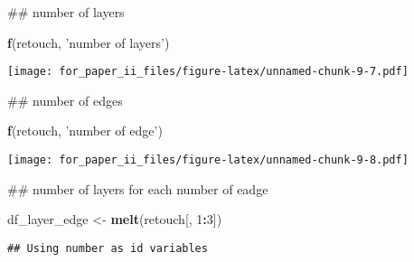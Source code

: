 \documentclass[]{article}
\newenvironment{Shaded}{\begin{snugshade}}{\end{snugshade}}
\newcommand{\KeywordTok}[1]{\textcolor[rgb]{0.13,0.29,0.53}{\textbf{#1}}}
\newcommand{\DataTypeTok}[1]{\textcolor[rgb]{0.13,0.29,0.53}{#1}}
\newcommand{\DecValTok}[1]{\textcolor[rgb]{0.00,0.00,0.81}{#1}}
\newcommand{\FloatTok}[1]{\textcolor[rgb]{0.00,0.00,0.81}{#1}}
\newcommand{\StringTok}[1]{\textcolor[rgb]{0.31,0.60,0.02}{#1}}
\newcommand{\OperatorTok}[1]{\textcolor[rgb]{0.81,0.36,0.00}{\textbf{#1}}}
\newcommand{\NormalTok}[1]{#1}
\begin{document}
\begin{Shaded}
\begin{Highlighting}[]
\NormalTok{## number of layers}

\KeywordTok{f}\NormalTok{(retouch, }\StringTok{'number of layers'}\NormalTok{)}
\end{Highlighting}
\end{Shaded}

\texttt{[image: for\_paper\_ii\_files/figure-latex/unnamed-chunk-9-7.pdf]}

\begin{Shaded}
\begin{Highlighting}[]
\NormalTok{## number of edges}

\KeywordTok{f}\NormalTok{(retouch, }\StringTok{'number of edge'}\NormalTok{)}
\end{Highlighting}
\end{Shaded}

\texttt{[image: for\_paper\_ii\_files/figure-latex/unnamed-chunk-9-8.pdf]}

\begin{Shaded}
\begin{Highlighting}[]
\NormalTok{## number of layers for each number of eadge}

\NormalTok{df_layer_edge <-}\StringTok{ }\KeywordTok{melt}\NormalTok{(retouch[, }\DecValTok{1}\OperatorTok{:}\DecValTok{3}\NormalTok{])}
\end{Highlighting}
\end{Shaded}

\begin{verbatim}
## Using number as id variables
\end{verbatim}

\begin{Shaded}
\end{Shaded}
\end{document}
